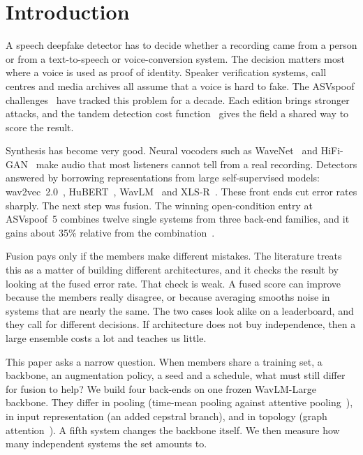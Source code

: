 \documentclass[twocolumn,a4paper,11pt]{article}
\begin{document}
\section{Introduction}
\label{sec:intro}

A speech deepfake detector has to decide whether a recording came from a person
or from a text-to-speech or voice-conversion system. The decision matters most
where a voice is used as proof of identity. Speaker verification systems, call
centres and media archives all assume that a voice is hard to fake. The ASVspoof
challenges~\cite{asvspoof2019,asvspoof2021,liu2023asvspoof,asvspoof5} have
tracked this problem for a decade. Each edition brings stronger attacks, and the
tandem detection cost function~\cite{tdcf} gives the field a shared way to score
the result.

Synthesis has become very good. Neural vocoders such as WaveNet~\cite{wavenet}
and HiFi-GAN~\cite{hifigan} make audio that most listeners cannot tell from a
real recording. Detectors answered by borrowing representations from large
self-supervised models: wav2vec~2.0~\cite{wav2vec2}, HuBERT~\cite{hubert},
WavLM~\cite{wavlm} and XLS-R~\cite{xlsr}. These front ends cut error rates
sharply. The next step was fusion. The winning open-condition entry at
ASVspoof~5 combines twelve single systems from three back-end families, and it
gains about 35\% relative from the combination~\cite{ustc2024}.

Fusion pays only if the members make different mistakes. The literature
treats this as a matter of building different architectures, and it checks the
result by looking at the fused error rate. That check is weak. A fused score
can improve because the members really disagree, or because averaging smooths
noise in systems that are nearly the same. The two cases look alike on a
leaderboard, and they call for different decisions. If architecture does not
buy independence, then a large ensemble costs a lot and teaches us little.

This paper asks a narrow question. When members share a training set, a
backbone, an augmentation policy, a seed and a schedule, what must still differ
for fusion to help? We build four back-ends on one frozen WavLM-Large
backbone. They differ in pooling (time-mean pooling against attentive
pooling~\cite{attentive_pool}), in input representation (an added cepstral
branch), and in topology (graph attention~\cite{gat_spoof}). A fifth system
changes the backbone itself. We then measure how many independent systems the
set amounts to.
\end{document}
